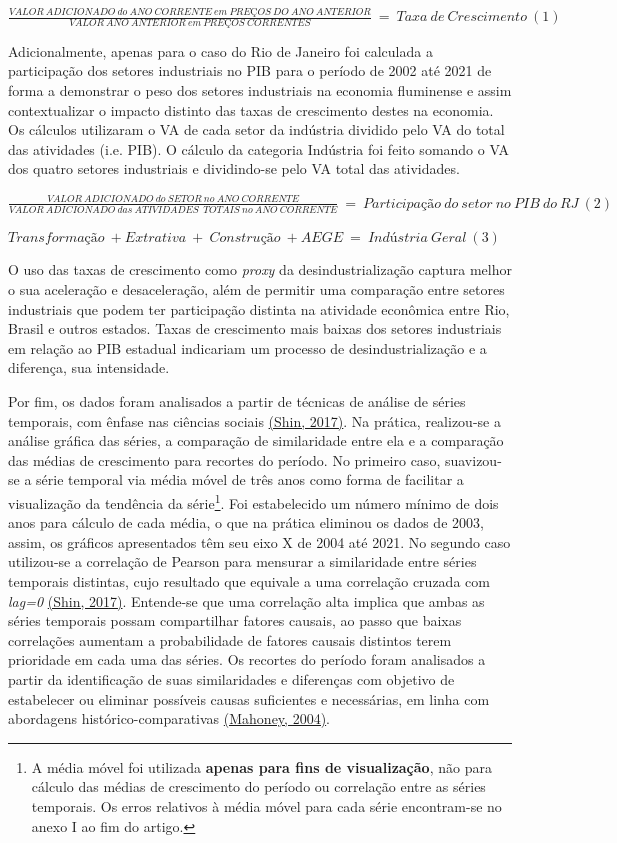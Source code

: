 \(\frac{VALOR\ ADICIONADO\ do\ ANO\ CORRENTE\ em\ PREÇOS\ DO\ ANO\ ANTERIOR}{VALOR\ ANO\ ANTERIOR\ em\ PREÇOS\ CORRENTES}\  = \ Taxa\ de\ Crescimento\ (1)\ \)

Adicionalmente, apenas para o caso do Rio de Janeiro foi calculada a
participação dos setores industriais no PIB para o período de 2002 até
2021 de forma a demonstrar o peso dos setores industriais na economia
fluminense e assim contextualizar o impacto distinto das taxas de
crescimento destes na economia. Os cálculos utilizaram o VA de cada
setor da indústria dividido pelo VA do total das atividades (i.e. PIB).
O cálculo da categoria Indústria foi feito somando o VA dos quatro
setores industriais e dividindo-se pelo VA total das atividades.

\(\frac{VALOR\ ADICIONADO\ do\ SETOR\ no\ ANO\ CORRENTE}{VALOR\ ADICIONADO\ das\ ATIVIDADES\ \ TOTAIS\ no\ ANO\ CORRENTE}\  = \ Participação\ do\ setor\ no\ PIB\ do\ RJ\ (2)\)

\(Transformação\  + Extrativa\  + \ Construção\  + AEGE\  = \ Indústria\ Geral\ (3)\)

O uso das taxas de crescimento como \emph{proxy} da desindustrialização
captura melhor o sua aceleração e desaceleração, além de permitir uma
comparação entre setores industriais que podem ter participação distinta
na atividade econômica entre Rio, Brasil e outros estados. Taxas de
crescimento mais baixas dos setores industriais em relação ao PIB
estadual indicariam um processo de desindustrialização e a diferença,
sua intensidade.

Por fim, os dados foram analisados a partir de técnicas de análise de
séries temporais, com ênfase nas ciências sociais
\href{https://www.zotero.org/google-docs/?fQMQx8}{(Shin, 2017)}. Na
prática, realizou-se a análise gráfica das séries, a comparação de
similaridade entre ela e a comparação das médias de crescimento para
recortes do período. No primeiro caso, suavizou-se a série temporal via
média móvel de três anos como forma de facilitar a visualização da
tendência da série\footnote{A média móvel foi utilizada \textbf{apenas
  para fins de visualização}, não para cálculo das médias de crescimento
  do período ou correlação entre as séries temporais. Os erros relativos
  à média móvel para cada série encontram-se no anexo I ao fim do
  artigo.}. Foi estabelecido um número mínimo de dois anos para cálculo
de cada média, o que na prática eliminou os dados de 2003, assim, os
gráficos apresentados têm seu eixo X de 2004 até 2021. No segundo caso
utilizou-se a correlação de Pearson para mensurar a similaridade entre
séries temporais distintas, cujo resultado que equivale a uma correlação
cruzada com \emph{lag=0}
\href{https://www.zotero.org/google-docs/?au1UC7}{(Shin, 2017)}.
Entende-se que uma correlação alta implica que ambas as séries temporais
possam compartilhar fatores causais, ao passo que baixas correlações
aumentam a probabilidade de fatores causais distintos terem prioridade
em cada uma das séries. Os recortes do período foram analisados a partir
da identificação de suas similaridades e diferenças com objetivo de
estabelecer ou eliminar possíveis causas suficientes e necessárias, em
linha com abordagens histórico-comparativas
\href{https://www.zotero.org/google-docs/?9E83JL}{(Mahoney, 2004)}.

